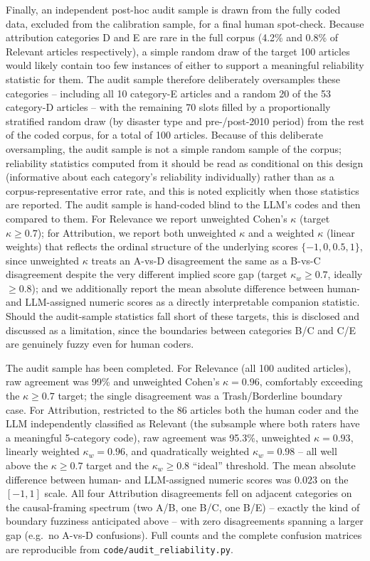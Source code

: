 \documentclass[12pt]{article}
\begin{document}
Finally, an independent post-hoc audit sample is drawn from the fully
coded data, excluded from the calibration sample, for a final human
spot-check. Because attribution categories D and E are rare in the
full corpus (4.2\% and 0.8\% of Relevant articles respectively), a
simple random draw of the target 100 articles would likely contain
too few instances of either to support a meaningful reliability
statistic for them. The audit sample therefore deliberately
oversamples these categories -- including all 10 category-E articles
and a random 20 of the 53 category-D articles -- with the remaining
70 slots filled by a proportionally stratified random draw (by
disaster type and pre-/post-2010 period) from the rest of the coded
corpus, for a total of 100 articles. Because of this deliberate
oversampling, the audit sample is not a simple random sample of the
corpus; reliability statistics computed from it should be read as
conditional on this design (informative about each category's
reliability individually) rather than as a corpus-representative
error rate, and this is noted explicitly when those statistics are
reported. The audit sample is hand-coded blind to the LLM's codes and
then compared to them. For Relevance we report unweighted Cohen's
$\kappa$ (target $\kappa \geq 0.7$); for Attribution, we report both
unweighted $\kappa$ and a weighted $\kappa$ (linear weights) that
reflects the ordinal structure of the underlying scores
$\{-1, 0, 0.5, 1\}$, since unweighted $\kappa$ treats an A-vs-D
disagreement the same as a B-vs-C disagreement despite the very
different implied score gap (target $\kappa_w \geq 0.7$, ideally
$\geq 0.8$); and we additionally report the mean absolute difference
between human- and LLM-assigned numeric scores as a directly
interpretable companion statistic. Should the audit-sample statistics
fall short of these targets, this is disclosed and discussed as a
limitation, since the boundaries between categories B/C and C/E are
genuinely fuzzy even for human coders.

The audit sample has been completed. For Relevance (all 100 audited
articles), raw agreement was 99\% and unweighted Cohen's $\kappa = 0.96$,
comfortably exceeding the $\kappa \geq 0.7$ target; the single
disagreement was a Trash/Borderline boundary case. For Attribution,
restricted to the 86 articles both the human coder and the LLM
independently classified as Relevant (the subsample where both raters
have a meaningful 5-category code), raw agreement was 95.3\%, unweighted
$\kappa = 0.93$, linearly weighted $\kappa_w = 0.96$, and quadratically
weighted $\kappa_w = 0.98$ -- all well above the $\kappa \geq 0.7$ target
and the $\kappa_w \geq 0.8$ ``ideal'' threshold. The mean absolute
difference between human- and LLM-assigned numeric scores was $0.023$ on
the $[-1, 1]$ scale. All four Attribution disagreements fell on adjacent
categories on the causal-framing spectrum (two A/B, one B/C, one B/E) --
exactly the kind of boundary fuzziness anticipated above -- with zero
disagreements spanning a larger gap (e.g.\ no A-vs-D confusions). Full
counts and the complete confusion matrices are reproducible from
\texttt{code/audit\_reliability.py}.
\end{document}
